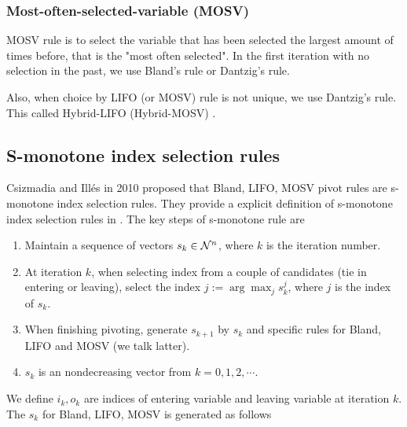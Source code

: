 \documentclass[11pt]{article}
\begin{document}
\subsubsection{Most-often-selected-variable (MOSV)}
MOSV rule is to select the variable that has been selected the largest amount of times before, that is the "most often selected". In the first iteration with no selection in the past, we use Bland's rule or Dantzig's rule.

Also, when choice by LIFO (or MOSV) rule is not unique, we use Dantzig's rule. This called Hybrid-LIFO (Hybrid-MOSV) \cite{zhang1999new}.

\subsection{S-monotone index selection rules} \label{secsmono}
Csizmadia and Illés in 2010 \cite{csizmadia2012s} proposed that Bland, LIFO, MOSV pivot rules are s-monotone index selection rules. They provide a explicit definition of s-monotone index selection rules in \cite{csizmadia2012s}. The key steps of s-monotone rule are
\begin{enumerate}
\item Maintain a sequence of vectors $s_k \in {\cal N}^n$, where $k$ is the iteration number. 
\item At iteration $k$, when selecting index from a couple of candidates (tie in entering or leaving), select the index $j := \arg \max_j s_k^j$, where $j$ is the index of $s_k$.
\item When finishing pivoting, generate $s_{k+1}$ by $s_{k}$ and specific rules for Bland, LIFO and MOSV (we talk latter). 
\item $s_k$ is an nondecreasing vector from $k=0,1,2,\cdots$.
\end{enumerate}
We define $i_k, o_k$ are indices of entering variable and leaving variable at iteration $k$. The $s_k$ for Bland, LIFO, MOSV is generated as follows
\end{document}
